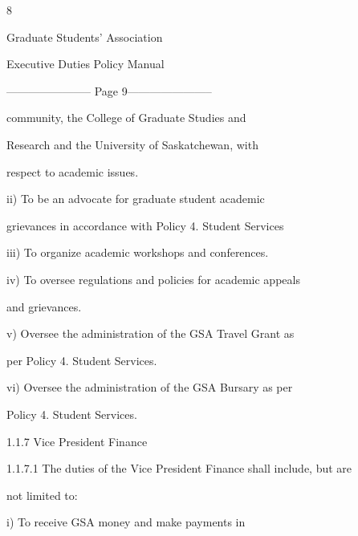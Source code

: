                                                  8  

                                     

                                   Graduate Students’ Association  

                                  Executive Duties Policy Manual  

  


----------------------- Page 9-----------------------

                  community,           the    College        of    Graduate        Studies       and  

                  Research   and   the   University   of   Saskatchewan,   with  

                  respect to academic issues.   

  

         ii)      To     be    an     advocate       for    graduate       student      academic  

                  grievances in accordance with Policy 4. Student Services   

  

         iii)     To organize academic workshops and conferences.   

  

  

         iv)      To oversee regulations and policies for academic appeals  

                  and grievances.   

         v)       Oversee  the  administration  of  the  GSA  Travel  Grant  as  

                  per Policy 4. Student Services.  

         vi)      Oversee  the  administration  of  the  GSA  Bursary  as  per  

                  Policy 4. Student Services.   

                    

1.1.7  Vice President Finance   

  

1.1.7.1 The duties of the Vice President Finance shall include, but are  

          not limited to:   

  

         i)       To      receive      GSA        money        and     make       payments         in  



